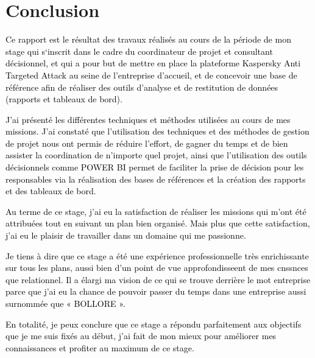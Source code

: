 \chapter{Conclusion }
\textcolor{black}{Ce rapport est le résultat des travaux réalisés au cours de la période de mon stage qui s‘inscrit dans le cadre du coordinateur de projet et consultant décisionnel, et qui a pour but de mettre en place la plateforme Kaspersky Anti Targeted Attack au seine de l’entreprise d’accueil, et de concevoir une base de référence afin de réaliser des outils d’analyse et de restitution de données (rapports et tableaux de bord).}

\textcolor{black}{J’ai présenté les différentes techniques et méthodes utilisées au cours de mes missions. J’ai constaté que l’utilisation des techniques et des méthodes de gestion de projet nous ont permis de réduire l’effort, de gagner du temps et de bien assister la coordination de n’importe quel projet, ainsi que l’utilisation des outils décisionnels comme POWER BI permet de faciliter la prise de décision pour les responsables via la réalisation des bases de références et la création des rapports et des tableaux de bord.}

\textcolor{black}{Au terme de ce stage, j’ai eu la satisfaction de réaliser les missions qui m’ont été attribuées tout en suivant un plan bien organisé. Mais plus que cette satisfaction, j’ai eu le plaisir de travailler dans un domaine qui me passionne.}

\textcolor{black}{Je tiens à dire que ce stage a été une expérience professionnelle très enrichissante sur tous les plans, aussi bien d'un point de vue approfondisseent de mes cnssnces que relationnel.
Il a élargi ma vision de ce qui se trouve derrière le mot entreprise parce que j’ai eu la chance de pouvoir passer du temps dans une entreprise aussi surnommée que « BOLLORE ».}

\textcolor{black}{En totalité, je peux conclure que ce stage a répondu parfaitement aux objectifs que je me suis fixés au début, j’ai fait de mon mieux pour améliorer mes connaissances et profiter au maximum de ce stage.}	
